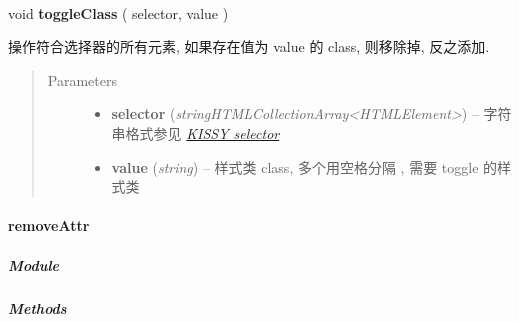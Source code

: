 \documentclass[letterpaper,10pt,english]{sphinxmanual}
\begin{document}
\begin{fulllineitems}
\label{api/core/dom/toggleClass:DOM.toggleClass}~
\begin{DUlineblock}{0em}
\item[] void \textbf{toggleClass} ( selector, value  )
\item[] 操作符合选择器的所有元素, 如果存在值为 value 的 class, 则移除掉, 反之添加.
\end{DUlineblock}
\begin{quote}\begin{description}
\item[{Parameters}] \leavevmode\begin{itemize}
\item {}
\textbf{selector} (\emph{string\textbar{}HTMLCollection\textbar{}Array\textless{}HTMLElement\textgreater{}}) -- 字符串格式参见 {\hyperref[api/core/dom/selector:dom-selector]{\emph{KISSY selector}}}

\item {}
\textbf{value} (\emph{string}) -- 样式类 class, 多个用空格分隔 , 需要 toggle 的样式类

\end{itemize}

\end{description}\end{quote}

\end{fulllineitems}



\paragraph{removeAttr}
\label{api/core/dom/removeAttr:removeattr}\label{api/core/dom/removeAttr::doc}

\subparagraph{Module}
\label{api/core/dom/removeAttr:module}\begin{quote}

{\hyperref[api/core/dom/index:module-DOM]{}}
\end{quote}


\subparagraph{Methods}
\label{api/core/dom/removeAttr:methods}
\end{document}
